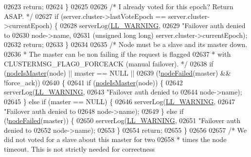 \begin{DoxyCode}
{{{{{{{{{{{{{{{{{{{{{{{{{{{{{{{{{{{{{{{{{02623         \textcolor{keywordflow}{return};
02624     \}
02625 
02626     \textcolor{comment}{/* I already voted for this epoch? Return ASAP. */}
02627     \textcolor{keywordflow}{if} (server.cluster->lastVoteEpoch == server.cluster->currentEpoch) \{
02628         serverLog(\hyperlink{server_8h_a31229b9334bba7d6be2a72970967a14b}{LL\_WARNING},
02629                 \textcolor{stringliteral}{"Failover auth denied to %
02630                 node->name,
02631                 (\textcolor{keywordtype}{unsigned} \textcolor{keywordtype}{long} \textcolor{keywordtype}{long}) server.cluster->currentEpoch);
02632         \textcolor{keywordflow}{return};
02633     \}
02634 
02635     \textcolor{comment}{/* Node must be a slave and its master down.}
02636 \textcolor{comment}{     * The master can be non failing if the request is flagged}
02637 \textcolor{comment}{     * with CLUSTERMSG\_FLAG0\_FORCEACK (manual failover). */}
02638     \textcolor{keywordflow}{if} (\hyperlink{cluster_8h_a2d8e84269474d8750565fb3fb67aa436}{nodeIsMaster}(node) || master == NULL ||
02639         (!\hyperlink{cluster_8h_a6a31c614ff4f5ac8ebaa630b0a921c3d}{nodeFailed}(master) && !force\_ack))
02640     \{
02641         \textcolor{keywordflow}{if} (\hyperlink{cluster_8h_a2d8e84269474d8750565fb3fb67aa436}{nodeIsMaster}(node)) \{
02642             serverLog(\hyperlink{server_8h_a31229b9334bba7d6be2a72970967a14b}{LL\_WARNING},
02643                     \textcolor{stringliteral}{"Failover auth denied to %
02644                     node->name);
02645         \} \textcolor{keywordflow}{else} \textcolor{keywordflow}{if} (master == NULL) \{
02646             serverLog(\hyperlink{server_8h_a31229b9334bba7d6be2a72970967a14b}{LL\_WARNING},
02647                     \textcolor{stringliteral}{"Failover auth denied to %
02648                     node->name);
02649         \} \textcolor{keywordflow}{else} \textcolor{keywordflow}{if} (!\hyperlink{cluster_8h_a6a31c614ff4f5ac8ebaa630b0a921c3d}{nodeFailed}(master)) \{
02650             serverLog(\hyperlink{server_8h_a31229b9334bba7d6be2a72970967a14b}{LL\_WARNING},
02651                     \textcolor{stringliteral}{"Failover auth denied to %
02652                     node->name);
02653         \}
02654         \textcolor{keywordflow}{return};
02655     \}
02656 
02657     \textcolor{comment}{/* We did not voted for a slave about this master for two}
02658 \textcolor{comment}{     * times the node timeout. This is not strictly needed for correctness}
}}}}}}}}}}}}}}}}}}}}}}}}}}}}}}}}}}}}}}}}}}}}}
\end{DoxyCode}
